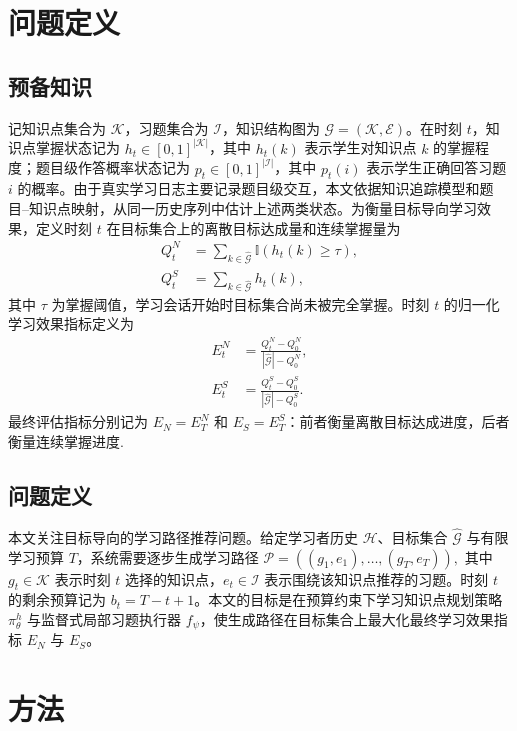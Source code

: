 \documentclass[UTF8,a4paper,zihao=5,twocolumn]{ctexart}
\begin{document}
\section{问题定义}

\subsection{预备知识}
记知识点集合为 $\mathcal{K}$，习题集合为 $\mathcal{I}$，知识结构图为 $\mathcal{G}=(\mathcal{K},\mathcal{E})$。在时刻 $t$，知识点掌握状态记为 $h_t\in[0,1]^{|\mathcal{K}|}$，其中 $h_t(k)$ 表示学生对知识点 $k$ 的掌握程度；题目级作答概率状态记为 $p_t\in[0,1]^{|\mathcal{I}|}$，其中 $p_t(i)$ 表示学生正确回答习题 $i$ 的概率。由于真实学习日志主要记录题目级交互，本文依据知识追踪模型和题目--知识点映射，从同一历史序列中估计上述两类状态\cite{LiuGL2025}。为衡量目标导向学习效果，定义时刻 $t$ 在目标集合上的离散目标达成量和连续掌握量为
\begin{equation}
\begin{aligned}
Q_t^N &= \sum_{k\in\hat{\mathcal{G}}}
\mathbb{I}\!\left(h_t(k)\geq\tau\right),\\
Q_t^S &= \sum_{k\in\hat{\mathcal{G}}} h_t(k),
\end{aligned}
\end{equation}
其中 $\tau$ 为掌握阈值，学习会话开始时目标集合尚未被完全掌握。时刻 $t$ 的归一化学习效果指标定义为
\begin{equation}
\begin{aligned}
E_t^N &= \frac{Q_t^N-Q_0^N}{|\hat{\mathcal{G}}|-Q_0^N},\\
E_t^S &= \frac{Q_t^S-Q_0^S}{|\hat{\mathcal{G}}|-Q_0^S}.
\end{aligned}
\end{equation}
最终评估指标分别记为 $E_N=E_T^N$ 和 $E_S=E_T^S$：前者衡量离散目标达成进度，后者衡量连续掌握进度.
\subsection{问题定义}
本文关注目标导向的学习路径推荐问题。给定学习者历史 $\mathcal{H}$、目标集合 $\hat{\mathcal{G}}$ 与有限学习预算 $T$，系统需要逐步生成学习路径
$
\mathcal{P}=((g_1,e_1),\dots,(g_T,e_T)),
$
其中 $g_t\in\mathcal{K}$ 表示时刻 $t$ 选择的知识点，$e_t\in\mathcal{I}$ 表示围绕该知识点推荐的习题。时刻 $t$ 的剩余预算记为 $b_t=T-t+1$。本文的目标是在预算约束下学习知识点规划策略 $\pi^h_\theta$ 与监督式局部习题执行器 $f_\psi$，使生成路径在目标集合上最大化最终学习效果指标 $E_N$ 与 $E_S$。

\section{方法}
\end{document}
